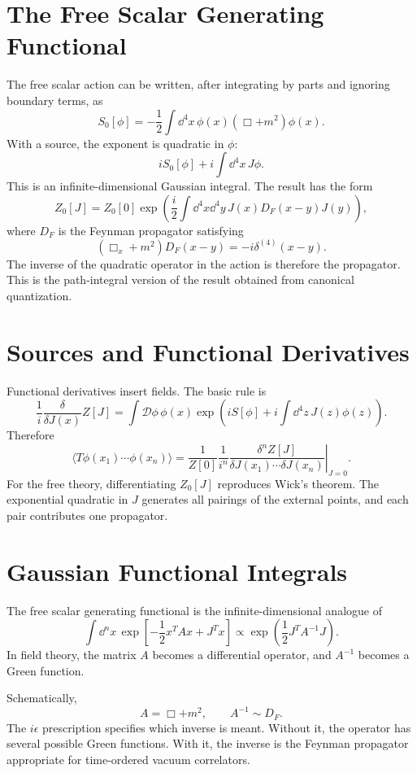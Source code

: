 \section{The Free Scalar Generating Functional}

The free scalar action can be written, after integrating by parts and ignoring
boundary terms, as
\[
    S_0[\phi]
    = -\frac{1}{2}\int\dd^4x\,\phi(x)(\Box+m^2)\phi(x).
\]
With a source, the exponent is quadratic in \(\phi\):
\[
    iS_0[\phi]+i\int\dd^4x\,J\phi.
\]
This is an infinite-dimensional Gaussian integral. The result has the form
\[
    Z_0[J]
    = Z_0[0]\exp\left(
        \frac{i}{2}\int\dd^4x\dd^4y\,
        J(x)D_F(x-y)J(y)
      \right),
\]
where \(D_F\) is the Feynman propagator satisfying
\[
    (\Box_x+m^2)D_F(x-y)=-i\delta^{(4)}(x-y).
\]
The inverse of the quadratic operator in the action is therefore the propagator.
This is the path-integral version of the result obtained from canonical
quantization.

\section{Sources and Functional Derivatives}

Functional derivatives insert fields. The basic rule is
\[
    \frac{1}{i}\frac{\delta}{\delta J(x)}Z[J]
    = \int\mathcal{D}\phi\,\phi(x)
      \exp\left(iS[\phi]+i\int\dd^4z\,J(z)\phi(z)\right).
\]
Therefore
\[
    \langle T\phi(x_1)\cdots\phi(x_n)\rangle
    = \frac{1}{Z[0]}
      \left.\frac{1}{i^n}
      \frac{\delta^n Z[J]}{\delta J(x_1)\cdots\delta J(x_n)}\right|_{J=0}.
\]
For the free theory, differentiating \(Z_0[J]\) reproduces Wick's theorem. The
exponential quadratic in \(J\) generates all pairings of the external points,
and each pair contributes one propagator.

\section{Gaussian Functional Integrals}

The free scalar generating functional is the infinite-dimensional analogue of
\[
    \int \dd^n x\,
    \exp\left[-\frac{1}{2}x^TAx+J^Tx\right]
    \propto
    \exp\left(\frac{1}{2}J^TA^{-1}J\right).
\]
In field theory, the matrix \(A\) becomes a differential operator, and
\(A^{-1}\) becomes a Green function.

Schematically,
\[
    A = \Box+m^2,
    \qquad
    A^{-1} \sim D_F.
\]
The \(i\epsilon\) prescription specifies which inverse is meant. Without it, the
operator has several possible Green functions. With it, the inverse is the
Feynman propagator appropriate for time-ordered vacuum correlators.

